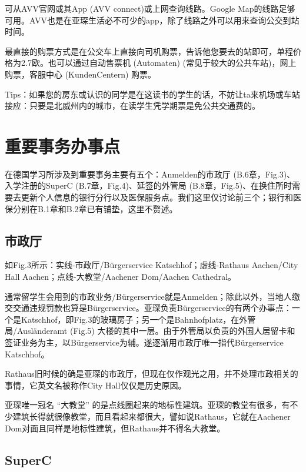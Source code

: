     可从AVV官网或其App (AVV connect)或上网查询线路。Google Map的线路足够可用。AVV也是在亚琛生活必不可少的app，除了线路之外可以用来查询公交到站时间。

    最直接的购票方式是在公交车上直接向司机购票，告诉他您要去的站即可，单程价格为2.7欧。也可以通过自动售票机 (Automaten) (常见于较大的公共车站)，网上购票，客服中心 (KundenCentern) 购票。

    Tips：如果您的房东或认识的同学是在这读书的学生的话，不妨让ta来机场或车站接应：只要是北威州内的城市，在读学生凭学期票是免公共交通费的。

\section{重要事务办事点}\label{sec:重要事务办事点}

  在德国学习所涉及到重要事务主要有五个：Anmelden的市政厅 (B.6章，Fig.3)、入学注册的SuperC (B.7章，Fig.4)、延签的外管局 (B.8章，Fig.5)、在换住所时需要去更新个人信息的银行分行以及医保服务点。我们这里仅讨论前三个；银行和医保分别在B.1章和B.2章已有铺垫，这里不赘述。

  \subsection{市政厅}\label{subsec:市政厅}

    如Fig.3所示：实线-市政厅/Bürgerservice Katschhof；虚线-Rathaus Aachen/City Hall Aachen；点线-大教堂/Aachener Dom/Aachen Cathedral。

    通常留学生会用到的市政业务/Bürgerservice就是Anmelden；除此以外，当地人缴交交通违规罚款也算是Bürgerservice。亚琛负责Bürgerservice的有两个办事点：一个是Katschhof，即Fig.3的玻璃房子；另一个是Bahnhofplatz，在外管局/Ausländeramt (Fig.5) 大楼的其中一层。由于外管局以负责的外国人居留卡和签证业务为主，以Bürgerservice为辅。遂逐渐用市政厅唯一指代Bürgerservice Katschhof。

    Rathaus旧时候的确是亚琛的市政厅，但现在仅作观光之用，并不处理市政相关的事情，它英文名被称作City Hall仅仅是历史原因。

    亚琛唯一冠名 “大教堂” 的是点线圈起来的地标性建筑。亚琛的教堂有很多，有不少建筑长得就很像教堂，而且看起来都很大，譬如说Rathaus，它就在Aachener Dom对面且同样是地标性建筑，但Rathaus并不得名大教堂。

  \subsection{SuperC}\label{subsec:SuperC}

